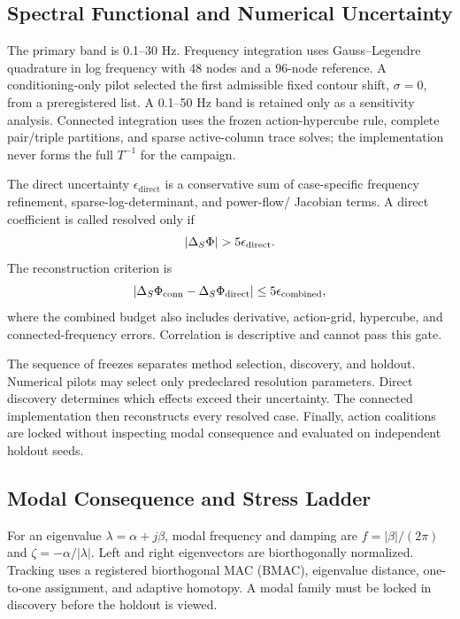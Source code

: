 \subsection{Spectral Functional and Numerical Uncertainty}

The primary band is 0.1--30 Hz. Frequency integration uses Gauss--Legendre
quadrature in log frequency with 48 nodes and a 96-node reference. A
conditioning-only pilot selected the first admissible fixed contour shift,
$\sigma=0$, from a preregistered list. A 0.1--50 Hz band is retained only as a
sensitivity analysis. Connected integration uses the frozen action-hypercube
rule, complete pair/triple partitions, and sparse active-column trace solves;
the implementation never forms the full $T^{-1}$ for the campaign.

The direct uncertainty $\epsilon_{\mathrm{direct}}$ is a conservative sum of
case-specific frequency refinement, sparse-log-determinant, and power-flow/
Jacobian terms. A direct coefficient is called resolved only if
\begin{equation}
|\ext{S}\Phi|>5\epsilon_{\mathrm{direct}}.
\label{eq:resolve}
\end{equation}
The reconstruction criterion is
\begin{equation}
|\Delta_{S}\Phi_{\mathrm{conn}}-\Delta_{S}\Phi_{\mathrm{direct}}|
\le 5\epsilon_{\mathrm{combined}},
\label{eq:recongate}
\end{equation}
where the combined budget also includes derivative, action-grid, hypercube,
and connected-frequency errors. Correlation is descriptive and cannot pass
this gate.

The sequence of freezes separates method selection, discovery, and holdout.
Numerical pilots may select only predeclared resolution parameters. Direct
discovery determines which effects exceed their uncertainty. The connected
implementation then reconstructs every resolved case. Finally, action
coalitions are locked without inspecting modal consequence and evaluated on
independent holdout seeds.

\subsection{Modal Consequence and Stress Ladder}

For an eigenvalue $\lambda=\alpha+j\beta$, modal frequency and damping are
$f=|\beta|/(2\pi)$ and $\zeta=-\alpha/|\lambda|$. Left and right
eigenvectors are biorthogonally normalized. Tracking uses a registered
biorthogonal MAC (BMAC), eigenvalue distance, one-to-one assignment, and
adaptive homotopy. A modal family must be locked in discovery before the
holdout is viewed.

